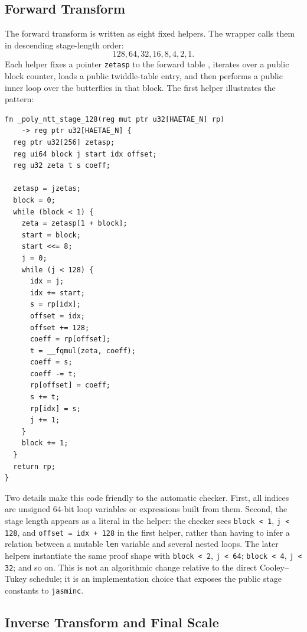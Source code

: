 \documentclass[10pt,twocolumn]{article}
\begin{document}
\subsection{Forward Transform}

The forward transform is written as eight fixed helpers.  The wrapper
 calls them in descending stage-length order:
\[
  128,64,32,16,8,4,2,1.
\]
Each helper fixes a pointer \texttt{zetasp} to the forward table
, iterates over a public block counter, loads a public
twiddle-table entry, and then performs a public inner loop over the butterflies
in that block.  The first helper illustrates the pattern:
\newpage
\begin{lstlisting}[caption={First stage-specialized forward NTT helper.},label={lst:nttstage}]
fn _poly_ntt_stage_128(reg mut ptr u32[HAETAE_N] rp)
    -> reg ptr u32[HAETAE_N] {
  reg ptr u32[256] zetasp;
  reg ui64 block j start idx offset;
  reg u32 zeta t s coeff;

  zetasp = jzetas;
  block = 0;
  while (block < 1) {
    zeta = zetasp[1 + block];
    start = block;
    start <<= 8;
    j = 0;
    while (j < 128) {
      idx = j;
      idx += start;
      s = rp[idx];
      offset = idx;
      offset += 128;
      coeff = rp[offset];
      t = __fqmul(zeta, coeff);
      coeff = s;
      coeff -= t;
      rp[offset] = coeff;
      s += t;
      rp[idx] = s;
      j += 1;
    }
    block += 1;
  }
  return rp;
}
\end{lstlisting}

Two details make this code friendly to the automatic checker.  First, all
indices are unsigned 64-bit loop variables or expressions built from them.
Second, the stage length appears as a literal in the helper: the checker sees
\texttt{block < 1}, \texttt{j < 128}, and \texttt{offset = idx + 128} in the
first helper, rather than having to infer a relation between a mutable
\texttt{len} variable and several nested loops.  The later helpers instantiate
the same proof shape with \texttt{block < 2}, \texttt{j < 64};
\texttt{block < 4}, \texttt{j < 32}; and so on.  This is not an algorithmic
change relative to the direct Cooley--Tukey schedule; it is an implementation
choice that exposes the public stage constants to \texttt{jasminc}.

\subsection{Inverse Transform and Final Scale}
\end{document}
